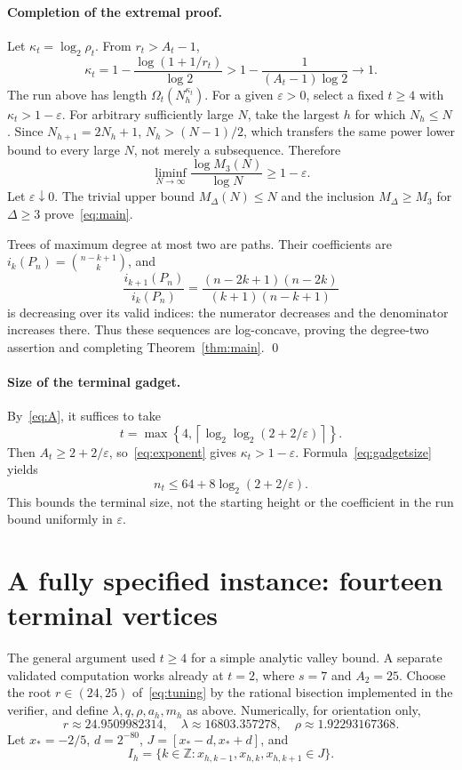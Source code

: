 \documentclass[11pt]{article}
\begin{document}
\paragraph{Completion of the extremal proof.}
Let $\kappa_t=\log_2\rho_t$. From $r_t>A_t-1$,
\begin{equation}\label{eq:exponent}
 \kappa_t=1-\frac{\log(1+1/r_t)}{\log2}
 >1-\frac1{(A_t-1)\log2}\longrightarrow1.
\end{equation}
The run above has length $\Omega_t(N_h^{\kappa_t})$.
For a given $\varepsilon>0$, select a fixed $t\ge4$ with
$\kappa_t>1-\varepsilon$. For arbitrary sufficiently large $N$, take
the largest $h$ for which $N_h\le N$. Since $N_{h+1}=2N_h+1$,
$N_h>(N-1)/2$, which transfers the same power lower bound to every
large $N$, not merely a subsequence.
Therefore
\[
 \liminf_{N\to\infty}\frac{\log M_3(N)}{\log N}\ge1-\varepsilon.
\]
Let $\varepsilon\downarrow0$. The trivial upper bound
$M_\Delta(N)\le N$ and the inclusion $M_\Delta\ge M_3$ for
$\Delta\ge3$ prove~\eqref{eq:main}.

Trees of maximum degree at most two are paths. Their coefficients are
$i_k(P_n)=\binom{n-k+1}{k}$, and
\[
 \frac{i_{k+1}(P_n)}{i_k(P_n)}
 =\frac{(n-2k+1)(n-2k)}{(k+1)(n-k+1)}
\]
is decreasing over its valid indices: the numerator decreases and the
denominator increases there. Thus these sequences are log-concave,
proving the degree-two assertion and completing Theorem~\ref{thm:main}.
\qed

\paragraph{Size of the terminal gadget.}
By~\eqref{eq:A}, it suffices to take
\[
 t=\max\left\{4,
 \left\lceil\log_2\log_2(2+2/\varepsilon)\right\rceil\right\}.
\]
Then $A_t\ge2+2/\varepsilon$, so~\eqref{eq:exponent} gives
$\kappa_t>1-\varepsilon$. Formula~\eqref{eq:gadgetsize} yields
\[
 n_t\le64+8\log_2(2+2/\varepsilon).
\]
This bounds the terminal size, not the starting height or the coefficient
in the run bound uniformly in $\varepsilon$.

\section{A fully specified instance: fourteen terminal vertices}
The general argument used $t\ge4$ for a simple analytic valley bound.
A separate validated computation works already at $t=2$, where $s=7$
and $A_2=25$. Choose the root $r\in(24,25)$ of~\eqref{eq:tuning}
by the rational bisection implemented in the verifier, and define
$\lambda,q,\rho,a_h,m_h$ as above. Numerically, for orientation only,
\[
 r\approx24.9509982314,\quad \lambda\approx16803.357278,
 \quad \rho\approx1.92293167368.
\]
Let $x_*=-2/5$, $d=2^{-80}$, $J=[x_*-d,x_*+d]$, and
\[
 I_h=\{k\in\mathbb Z:x_{h,k-1},x_{h,k},x_{h,k+1}\in J\}.
\]
\end{document}
